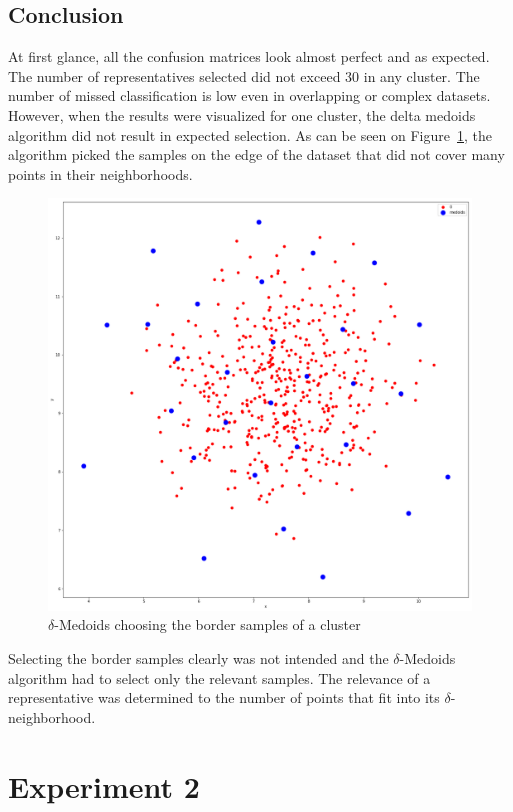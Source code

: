 \documentclass[thesis=B,english]{FITthesis}[2012/10/20]
\begin{document}
\subsection{Conclusion}
At first glance, all the confusion matrices look almost perfect and as expected.
The number of representatives selected did not exceed 30 in any cluster.
The number of missed classification is low even in overlapping or complex datasets.
However, when the results were visualized for one cluster, the delta medoids algorithm did not result in expected selection.
As can be seen on Figure~\ref{img:blobs_border_select}, the algorithm picked the samples on the edge of the dataset that did not cover many points in their neighborhoods.
\begin{figure}[H]
   \includegraphics[width=\linewidth]{img/delta_medoids_select.png}
  \caption{$\delta$-Medoids choosing the border samples of a cluster}
  \label{img:blobs_border_select}
\end{figure}
Selecting the border samples clearly was not intended and the $\delta$-Medoids algorithm had to select only the relevant samples.
The relevance of a representative was determined to the number of points that fit into its $\delta$-neighborhood. 

\section{Experiment 2}\label{sec:exp2}
\end{document}
